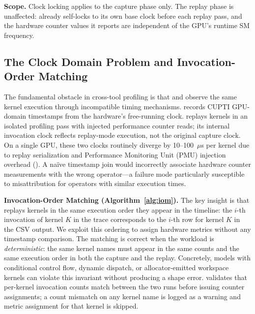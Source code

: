 \textbf{Scope.}
Clock locking applies to the \nsys capture phase only.  The \ncu replay phase is
unaffected: \ncu already self-locks to its own base clock before each replay pass, and
the hardware counter values it reports are independent of the GPU's runtime SM frequency.

\subsection{The Clock Domain Problem and Invocation-Order Matching}
\label{sec:clockdomain}

The fundamental obstacle in cross-tool profiling is that \nsys and \ncu observe the same kernel
execution through incompatible timing mechanisms. \nsys records CUPTI GPU-domain timestamps from
the hardware's free-running clock. \ncu replays kernels in an isolated profiling pass with injected
performance counter reads; its internal invocation clock reflects replay-mode execution, not the
original capture clock. On a single GPU, these two clocks routinely diverge by 10--100~$\mu$s per
kernel due to replay serialization and Performance Monitoring Unit (PMU) injection overhead (). A na\"{i}ve timestamp join would
incorrectly associate hardware counter measurements with the wrong operator---a failure mode
particularly susceptible to misattribution for operators with similar execution times.

\textbf{Invocation-Order Matching (Algorithm~\ref{alg:iom}).}  The key insight is that \ncu
replays kernels in the same execution order they appear in the \nsys timeline: the $i$-th
invocation of kernel $K$ in the \nsys trace corresponds to the $i$-th row for kernel $K$ in the
\ncu CSV output.  We exploit this ordering to assign hardware metrics without any timestamp
comparison. The matching is correct
when the workload is \emph{deterministic}: the same kernel names must
appear in the same counts and the same execution order in both the \nsys capture and the \ncu
replay.  Concretely, models with conditional control flow, dynamic dispatch, or
allocator-emitted workspace kernels can violate this invariant without producing a shape
error.  \sys validates that per-kernel invocation counts match between the two runs before
issuing counter assignments; a count mismatch on any kernel name is logged as a
warning and metric assignment for that kernel is skipped.

